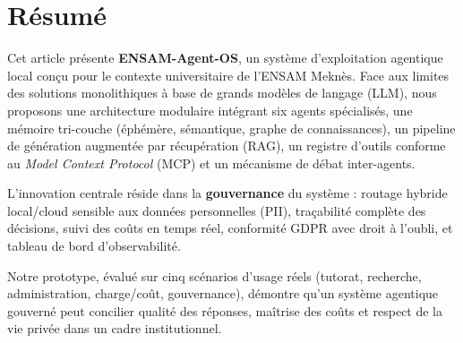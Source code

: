 \documentclass[12pt, a4paper]{article}
\newcommand{\acrshort}[1]{\MakeUppercase{#1}}
\begin{document}
\begin{titlepage}
\begin{center}
\vfill


\end{center}
\end{titlepage}


\newpage
\section*{Résumé}

\begin{definitionbox}
Cet article présente \textbf{ENSAM-Agent-OS}, un système d'exploitation agentique local conçu pour le contexte universitaire de l'ENSAM Meknès. Face aux limites des solutions monolithiques à base de grands modèles de langage (\acrshort{llm}), nous proposons une architecture modulaire intégrant six agents spécialisés, une mémoire tri-couche (éphémère, sémantique, graphe de connaissances), un pipeline de génération augmentée par récupération (\acrshort{rag}), un registre d'outils conforme au \textit{Model Context Protocol} (\acrshort{mcp}) et un mécanisme de débat inter-agents.

L'innovation centrale réside dans la \textbf{gouvernance} du système : routage hybride local/cloud sensible aux données personnelles (\acrshort{pii}), traçabilité complète des décisions, suivi des coûts en temps réel, conformité \acrshort{gdpr} avec droit à l'oubli, et tableau de bord d'observabilité.

Notre prototype, évalué sur cinq scénarios d'usage réels (tutorat, recherche, administration, charge/coût, gouvernance), démontre qu'un système agentique gouverné peut concilier qualité des réponses, maîtrise des coûts et respect de la vie privée dans un cadre institutionnel.
\end{definitionbox}
\end{document}
